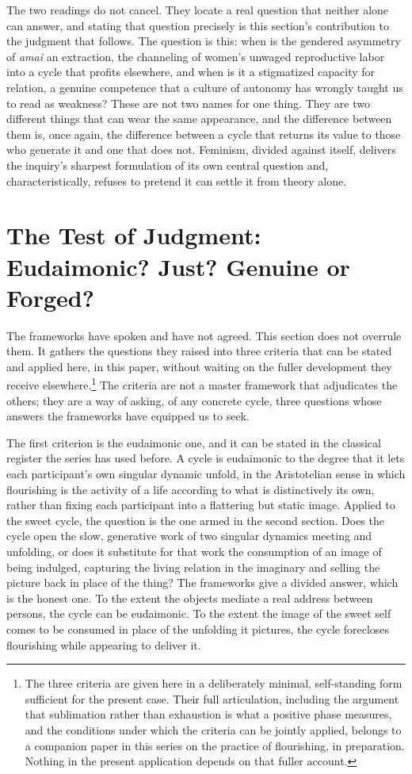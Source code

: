 The two readings do not cancel. They locate a real question that neither alone can answer, and stating that question precisely is this section's contribution to the judgment that follows. The question is this: when is the gendered asymmetry of \textit{amai} an extraction, the channeling of women's unwaged reproductive labor into a cycle that profits elsewhere, and when is it a stigmatized capacity for relation, a genuine competence that a culture of autonomy has wrongly taught us to read as weakness? These are not two names for one thing. They are two different things that can wear the same appearance, and the difference between them is, once again, the difference between a cycle that returns its value to those who generate it and one that does not. Feminism, divided against itself, delivers the inquiry's sharpest formulation of its own central question and, characteristically, refuses to pretend it can settle it from theory alone.

\section{The Test of Judgment: Eudaimonic? Just? Genuine or Forged?}

The frameworks have spoken and have not agreed. This section does not overrule them. It gathers the questions they raised into three criteria that can be stated and applied here, in this paper, without waiting on the fuller development they receive elsewhere.\footnote{The three criteria are given here in a deliberately minimal, self-standing form sufficient for the present case. Their full articulation, including the argument that sublimation rather than exhaustion is what a positive phase measures, and the conditions under which the criteria can be jointly applied, belongs to a companion paper in this series on the practice of flourishing, in preparation. Nothing in the present application depends on that fuller account.} The criteria are not a master framework that adjudicates the others; they are a way of asking, of any concrete cycle, three questions whose answers the frameworks have equipped us to seek.

The first criterion is the eudaimonic one, and it can be stated in the classical register the series has used before. A cycle is eudaimonic to the degree that it lets each participant's own singular dynamic unfold, in the Aristotelian sense in which flourishing is the activity of a life according to what is distinctively its own, rather than fixing each participant into a flattering but static image. Applied to the sweet cycle, the question is the one armed in the second section. Does the cycle open the slow, generative work of two singular dynamics meeting and unfolding, or does it substitute for that work the consumption of an image of being indulged, capturing the living relation in the imaginary and selling the picture back in place of the thing? The frameworks give a divided answer, which is the honest one. To the extent the objects mediate a real address between persons, the cycle can be eudaimonic. To the extent the image of the sweet self comes to be consumed in place of the unfolding it pictures, the cycle forecloses flourishing while appearing to deliver it.


